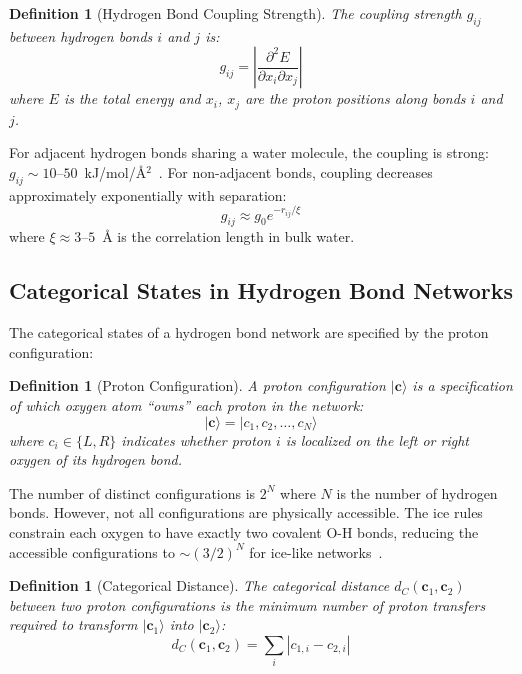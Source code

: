 \documentclass[twocolumn,showpacs,preprintnumbers,amsmath,amssymb,prd]{revtex4-2}
\newtheorem{definition}[theorem]{Definition}
\begin{document}
\begin{definition}[Hydrogen Bond Coupling Strength]
\label{def:hbond_coupling}
The coupling strength $g_{ij}$ between hydrogen bonds $i$ and $j$ is:
\begin{equation}
g_{ij} = \left|\frac{\partial^2 E}{\partial x_i \partial x_j}\right|
\label{eq:hbond_coupling}
\end{equation}
where $E$ is the total energy and $x_i$, $x_j$ are the proton positions along bonds $i$ and $j$.
\end{definition}

For adjacent hydrogen bonds sharing a water molecule, the coupling is strong: $g_{ij} \sim 10$--$50$~kJ/mol/\AA$^2$~\cite{Marx2006}. For non-adjacent bonds, coupling decreases approximately exponentially with separation:
\begin{equation}
g_{ij} \approx g_0 e^{-r_{ij}/\xi}
\label{eq:coupling_decay}
\end{equation}
where $\xi \approx 3$--$5$~\AA{} is the correlation length in bulk water.

\subsection{Categorical States in Hydrogen Bond Networks}

The categorical states of a hydrogen bond network are specified by the proton configuration:

\begin{definition}[Proton Configuration]
\label{def:proton_config}
A proton configuration $|\mathbf{c}\rangle$ is a specification of which oxygen atom ``owns'' each proton in the network:
\begin{equation}
|\mathbf{c}\rangle = |c_1, c_2, \ldots, c_N\rangle
\label{eq:proton_config}
\end{equation}
where $c_i \in \{L, R\}$ indicates whether proton $i$ is localized on the left or right oxygen of its hydrogen bond.
\end{definition}

The number of distinct configurations is $2^N$ where $N$ is the number of hydrogen bonds. However, not all configurations are physically accessible. The ice rules constrain each oxygen to have exactly two covalent O-H bonds, reducing the accessible configurations to $\sim (3/2)^N$ for ice-like networks~\cite{Pauling1935}.

\begin{definition}[Categorical Distance]
\label{def:categorical_distance_h}
The categorical distance $d_C(\mathbf{c}_1, \mathbf{c}_2)$ between two proton configurations is the minimum number of proton transfers required to transform $|\mathbf{c}_1\rangle$ into $|\mathbf{c}_2\rangle$:
\begin{equation}
d_C(\mathbf{c}_1, \mathbf{c}_2) = \sum_i |c_{1,i} - c_{2,i}|
\label{eq:categorical_distance_h}
\end{equation}
\end{definition}
\end{document}
